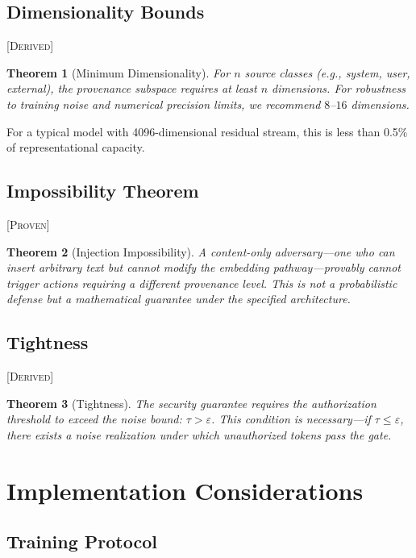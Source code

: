 \documentclass[11pt,a4paper]{article}
\theoremstyle{plain}
\newtheorem{theorem}{Theorem}[section]
\theoremstyle{definition}
\theoremstyle{remark}
\newcommand{\proven}{\textsc{[Proven]}}
\newcommand{\derived}{\textsc{[Derived]}}
\begin{document}
\subsection{Dimensionality Bounds} \derived

\begin{theorem}[Minimum Dimensionality]
For $n$ source classes (e.g., system, user, external), the provenance subspace requires at least $n$ dimensions. For robustness to training noise and numerical precision limits, we recommend $8$--$16$ dimensions.
\end{theorem}

For a typical model with 4096-dimensional residual stream, this is less than 0.5\% of representational capacity.

\subsection{Impossibility Theorem} \proven

\begin{theorem}[Injection Impossibility]
A content-only adversary---one who can insert arbitrary text but cannot modify the embedding pathway---provably cannot trigger actions requiring a different provenance level. This is not a probabilistic defense but a mathematical guarantee under the specified architecture.
\end{theorem}

\subsection{Tightness} \derived

\begin{theorem}[Tightness]
The security guarantee requires the authorization threshold to exceed the noise bound: $\tau > \varepsilon$. This condition is necessary---if $\tau \leq \varepsilon$, there exists a noise realization under which unauthorized tokens pass the gate.
\end{theorem}

\section{Implementation Considerations}

\subsection{Training Protocol}
\end{document}
